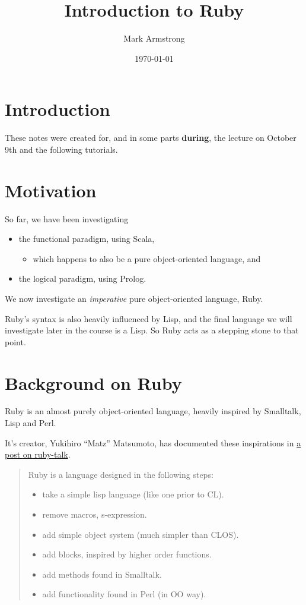 \documentclass[11pt]{article}
\author{Mark Armstrong}
\date{\today}
\title{Introduction to Ruby}
\begin{document}
\maketitle
\tableofcontents


\section{Introduction}
\label{sec:org4305229}
These notes were created for, and in some parts \textbf{during},
the lecture on October 9th and the following tutorials.

\section{Motivation}
\label{sec:org277e45a}
So far, we have been investigating
\begin{itemize}
\item the functional paradigm, using Scala,
\begin{itemize}
\item which happens to also be a pure object-oriented language, and
\end{itemize}
\item the logical paradigm, using Prolog.
\end{itemize}

We now investigate an \emph{imperative} pure object-oriented language, Ruby.

Ruby's syntax is also heavily influenced by Lisp,
and the final language we will investigate later in the course
is a Lisp.
So Ruby acts as a stepping stone to that point.

\section{Background on Ruby}
\label{sec:org98679b3}
Ruby is an almost purely object-oriented language,
heavily inspired by Smalltalk, Lisp and Perl.

It's creator, Yukihiro “Matz” Matsumoto,
has documented these inspirations in
\href{http://blade.nagaokaut.ac.jp/cgi-bin/scat.rb/ruby/ruby-talk/179642}{a post on ruby-talk}.
\begin{quote}
Ruby is a language designed in the following steps:

\begin{itemize}
\item take a simple lisp language (like one prior to CL).
\item remove macros, s-expression.
\item add simple object system (much simpler than CLOS).
\item add blocks, inspired by higher order functions.
\item add methods found in Smalltalk.
\item add functionality found in Perl (in OO way).
\end{itemize}
\end{quote}
\end{document}
